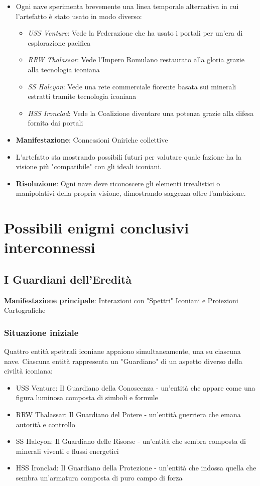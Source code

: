 \documentclass[letterpaper,twocolumn,openany,nodeprecatedcode]{dndbook}
\begin{document}
\begin{itemize}
    \item Ogni nave sperimenta brevemente una linea temporale alternativa in cui l'artefatto è stato usato in modo diverso:
\begin{itemize}
    \item \textit{USS Venture}: Vede la Federazione che ha usato i portali per un'era di esplorazione pacifica
    \item \textit{RRW Thalassar}: Vede l'Impero Romulano restaurato alla gloria grazie alla tecnologia iconiana
    \item \textit{SS Halcyon}: Vede una rete commerciale fiorente basata sui minerali estratti tramite tecnologia iconiana
    \item \textit{HSS Ironclad}: Vede la Coalizione diventare una potenza grazie alla difesa fornita dai portali
\end{itemize}
    \item \textbf{Manifestazione}: Connessioni Oniriche collettive
    \item L'artefatto sta mostrando possibili futuri per valutare quale fazione ha la visione più "compatibile" con gli ideali iconiani.
    \item \textbf{Risoluzione}: Ogni nave deve riconoscere gli elementi irrealistici o manipolativi della propria visione, dimostrando saggezza oltre l'ambizione.
\end{itemize}



\section{Possibili enigmi conclusivi interconnessi}
\subsection{I Guardiani dell'Eredità}
\textbf{Manifestazione principale}: Interazioni con "Spettri" Iconiani e Proiezioni Cartografiche
\subsubsection{Situazione iniziale}
Quattro entità spettrali iconiane appaiono simultaneamente, una su ciascuna nave. Ciascuna entità rappresenta un "Guardiano" di un aspetto diverso della civiltà iconiana:

\begin{itemize}
    \item USS Venture: Il Guardiano della Conoscenza - un'entità che appare come una figura luminosa composta di simboli e formule
    \item RRW Thalassar: Il Guardiano del Potere - un'entità guerriera che emana autorità e controllo
    \item SS Halcyon: Il Guardiano delle Risorse - un'entità che sembra composta di minerali viventi e flussi energetici
    \item HSS Ironclad: Il Guardiano della Protezione - un'entità che indossa quella che sembra un'armatura composta di puro campo di forza
\end{itemize}
\end{document}
